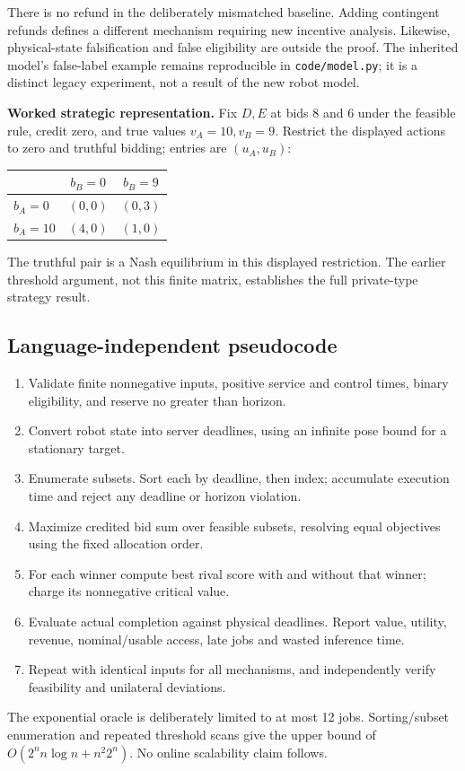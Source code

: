 There is no refund in the deliberately mismatched baseline. Adding contingent refunds defines a different mechanism requiring new incentive analysis. Likewise, physical-state falsification and false eligibility are outside the proof. The inherited model's false-label example remains reproducible in \texttt{code/model.py}; it is a distinct legacy experiment, not a result of the new robot model.

\textbf{Worked strategic representation.} Fix $D,E$ at bids 8 and 6 under the feasible rule, credit zero, and true values $v_A=10,v_B=9$. Restrict the displayed actions to zero and truthful bidding; entries are $(u_A,u_B)$:
\begin{center}\begin{tabular}{lcc}\toprule
 & $b_B=0$ & $b_B=9$\\\midrule
$b_A=0$ & $(0,0)$ & $(0,3)$\\
$b_A=10$ & $(4,0)$ & $(1,0)$\\\bottomrule
\end{tabular}\end{center}
The truthful pair is a Nash equilibrium in this displayed restriction. The earlier threshold argument, not this finite matrix, establishes the full private-type strategy result.

\subsection{Language-independent pseudocode}
\begin{enumerate}
\item Validate finite nonnegative inputs, positive service and control times, binary eligibility, and reserve no greater than horizon.
\item Convert robot state into server deadlines, using an infinite pose bound for a stationary target.
\item Enumerate subsets. Sort each by deadline, then index; accumulate execution time and reject any deadline or horizon violation.
\item Maximize credited bid sum over feasible subsets, resolving equal objectives using the fixed allocation order.
\item For each winner compute best rival score with and without that winner; charge its nonnegative critical value.
\item Evaluate actual completion against physical deadlines. Report value, utility, revenue, nominal/usable access, late jobs and wasted inference time.
\item Repeat with identical inputs for all mechanisms, and independently verify feasibility and unilateral deviations.
\end{enumerate}
The exponential oracle is deliberately limited to at most 12 jobs. Sorting/subset enumeration and repeated threshold scans give the upper bound of $O(2^n n\log n+n^2 2^n)$. No online scalability claim follows.

